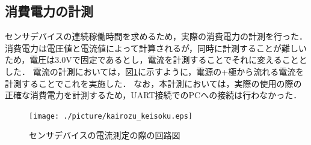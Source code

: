 \subsection*{消費電力の計測}
センサデバイスの連続稼働時間を求めるため，実際の消費電力の計測を行った．
消費電力は電圧値と電流値によって計算されるが，同時に計測することが難しいため，電圧は3.0Vで固定であるとし，電流を計測することでそれに変えることとした．
電流の計測においては，図\ref{keisoku_kairozu}に示すように，電源の+極から流れる電流を計測することでこれを実施した．
なお，本計測においては，実際の使用の際の正確な消費電力を計測するため，UART接続でのPCへの接続は行わなかった．
\begin{figure}[htbp]
    \centering
    \texttt{[image: ./picture/kairozu\_keisoku.eps]}
    \caption{センサデバイスの電流測定の際の回路図}
    \label{keisoku_kairozu}
\end{figure}


